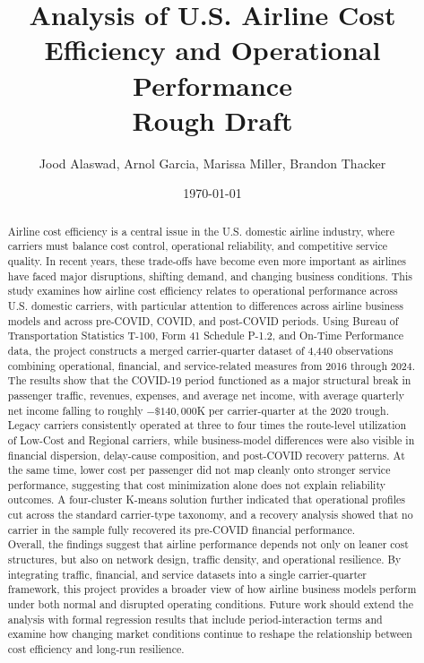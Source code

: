 \documentclass[11pt, letterpaper]{article}
\begin{document}
\title{Analysis of U.S. Airline Cost Efficiency and Operational Performance \\
\large Rough Draft}
\author{Jood Alaswad, Arnol Garcia, Marissa Miller, Brandon Thacker}
\date{\today}
\maketitle

\tableofcontents
\newpage
\setcounter{page}{1}

\begin{abstract}
Airline cost efficiency is a central issue in the U.S. domestic airline industry, where carriers must balance cost control, operational reliability, and competitive service quality. In recent years, these trade-offs have become even more important as airlines have faced major disruptions, shifting demand, and changing business conditions. This study examines how airline cost efficiency relates to operational performance across U.S. domestic carriers, with particular attention to differences across airline business models and across pre-COVID, COVID, and post-COVID periods. Using Bureau of Transportation Statistics T-100, Form 41 Schedule P-1.2, and On-Time Performance data, the project constructs a merged carrier-quarter dataset of 4,440 observations combining operational, financial, and service-related measures from 2016 through 2024.\\
\indent The results show that the COVID-19 period functioned as a major structural break in passenger traffic, revenues, expenses, and average net income, with average quarterly net income falling to roughly $-\$140{,}000$K per carrier-quarter at the 2020 trough. Legacy carriers consistently operated at three to four times the route-level utilization of Low-Cost and Regional carriers, while business-model differences were also visible in financial dispersion, delay-cause composition, and post-COVID recovery patterns. At the same time, lower cost per passenger did not map cleanly onto stronger service performance, suggesting that cost minimization alone does not explain reliability outcomes. A four-cluster K-means solution further indicated that operational profiles cut across the standard carrier-type taxonomy, and a recovery analysis showed that no carrier in the sample fully recovered its pre-COVID financial performance.\\
\indent Overall, the findings suggest that airline performance depends not only on leaner cost structures, but also on network design, traffic density, and operational resilience. By integrating traffic, financial, and service datasets into a single carrier-quarter framework, this project provides a broader view of how airline business models perform under both normal and disrupted operating conditions. Future work should extend the analysis with formal regression results that include period-interaction terms and examine how changing market conditions continue to reshape the relationship between cost efficiency and long-run resilience.
\end{abstract}
\end{document}
